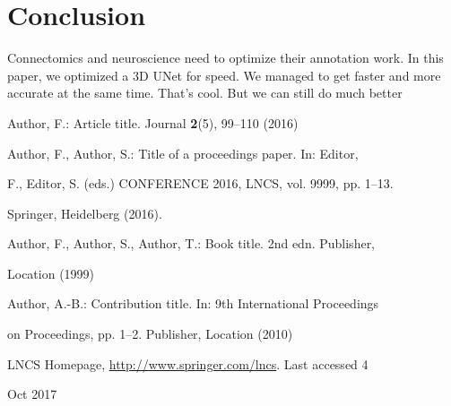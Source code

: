 \documentclass[runningheads]{llncs}
\begin{document}
\section{Conclusion}
Connectomics and neuroscience need to optimize their annotation work.
In this paper, we optimized a 3D UNet for speed.
We managed to get faster and more accurate at the same time.
That's cool.
But we can still do much better



%


%



%

% 

% 

%

\begin{thebibliography}{8}


Author, F.: Article title. Journal \textbf{2}(5), 99--110 (2016)




Author, F., Author, S.: Title of a proceedings paper. In: Editor,

F., Editor, S. (eds.) CONFERENCE 2016, LNCS, vol. 9999, pp. 1--13.

Springer, Heidelberg (2016). 




Author, F., Author, S., Author, T.: Book title. 2nd edn. Publisher,

Location (1999)




Author, A.-B.: Contribution title. In: 9th International Proceedings

on Proceedings, pp. 1--2. Publisher, Location (2010)




LNCS Homepage, \url{http://www.springer.com/lncs}. Last accessed 4

Oct 2017





\end{thebibliography}
\end{document}
